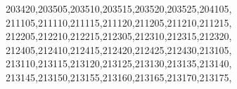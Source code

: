\documentclass[
  12,
  dvipsnames]{article}
\newenvironment{Shaded}{\begin{snugshade}}{\end{snugshade}}
\newcommand{\NormalTok}[1]{#1}
\newcommand{\StringTok}[1]{\textcolor[rgb]{0.31,0.60,0.02}{#1}}
\begin{document}
\begin{Shaded}
\begin{Highlighting}[]
                  \StringTok{\textquotesingle{}203420\textquotesingle{}}\NormalTok{,}\StringTok{\textquotesingle{}203505\textquotesingle{}}\NormalTok{,}\StringTok{\textquotesingle{}203510\textquotesingle{}}\NormalTok{,}\StringTok{\textquotesingle{}203515\textquotesingle{}}\NormalTok{,}\StringTok{\textquotesingle{}203520\textquotesingle{}}\NormalTok{,}\StringTok{\textquotesingle{}203525\textquotesingle{}}\NormalTok{,}\StringTok{\textquotesingle{}204105\textquotesingle{}}\NormalTok{,}
                  \StringTok{\textquotesingle{}211105\textquotesingle{}}\NormalTok{,}\StringTok{\textquotesingle{}211110\textquotesingle{}}\NormalTok{,}\StringTok{\textquotesingle{}211115\textquotesingle{}}\NormalTok{,}\StringTok{\textquotesingle{}211120\textquotesingle{}}\NormalTok{,}\StringTok{\textquotesingle{}211205\textquotesingle{}}\NormalTok{,}\StringTok{\textquotesingle{}211210\textquotesingle{}}\NormalTok{,}\StringTok{\textquotesingle{}211215\textquotesingle{}}\NormalTok{,}
                  \StringTok{\textquotesingle{}212205\textquotesingle{}}\NormalTok{,}\StringTok{\textquotesingle{}212210\textquotesingle{}}\NormalTok{,}\StringTok{\textquotesingle{}212215\textquotesingle{}}\NormalTok{,}\StringTok{\textquotesingle{}212305\textquotesingle{}}\NormalTok{,}\StringTok{\textquotesingle{}212310\textquotesingle{}}\NormalTok{,}\StringTok{\textquotesingle{}212315\textquotesingle{}}\NormalTok{,}\StringTok{\textquotesingle{}212320\textquotesingle{}}\NormalTok{,}
                  \StringTok{\textquotesingle{}212405\textquotesingle{}}\NormalTok{,}\StringTok{\textquotesingle{}212410\textquotesingle{}}\NormalTok{,}\StringTok{\textquotesingle{}212415\textquotesingle{}}\NormalTok{,}\StringTok{\textquotesingle{}212420\textquotesingle{}}\NormalTok{,}\StringTok{\textquotesingle{}212425\textquotesingle{}}\NormalTok{,}\StringTok{\textquotesingle{}212430\textquotesingle{}}\NormalTok{,}\StringTok{\textquotesingle{}213105\textquotesingle{}}\NormalTok{,}
                  \StringTok{\textquotesingle{}213110\textquotesingle{}}\NormalTok{,}\StringTok{\textquotesingle{}213115\textquotesingle{}}\NormalTok{,}\StringTok{\textquotesingle{}213120\textquotesingle{}}\NormalTok{,}\StringTok{\textquotesingle{}213125\textquotesingle{}}\NormalTok{,}\StringTok{\textquotesingle{}213130\textquotesingle{}}\NormalTok{,}\StringTok{\textquotesingle{}213135\textquotesingle{}}\NormalTok{,}\StringTok{\textquotesingle{}213140\textquotesingle{}}\NormalTok{,}
                  \StringTok{\textquotesingle{}213145\textquotesingle{}}\NormalTok{,}\StringTok{\textquotesingle{}213150\textquotesingle{}}\NormalTok{,}\StringTok{\textquotesingle{}213155\textquotesingle{}}\NormalTok{,}\StringTok{\textquotesingle{}213160\textquotesingle{}}\NormalTok{,}\StringTok{\textquotesingle{}213165\textquotesingle{}}\NormalTok{,}\StringTok{\textquotesingle{}213170\textquotesingle{}}\NormalTok{,}\StringTok{\textquotesingle{}213175\textquotesingle{}}\NormalTok{,}

\end{Highlighting}
\end{Shaded}
\end{document}
